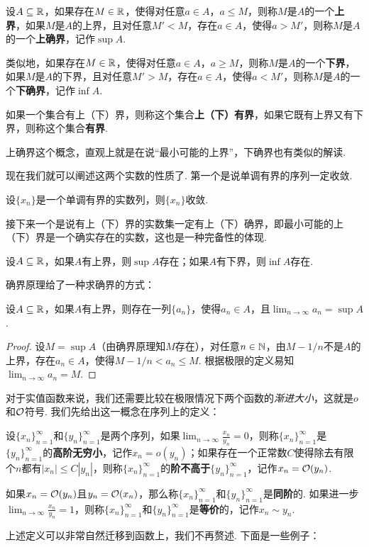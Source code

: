 \begin{definition}
    设$A\subseteq\mathbb{R}$，如果存在$M\in\mathbb{R}$，使得对任意$a\in A$，$a\leq M$，则称$M$是$A$的一个\textbf{上界}，如果$M$是$A$的上界，且对任意$M'<M$，存在$a\in A$，使得$a>M'$，则称$M$是$A$的一个\textbf{上确界}，记作$\sup A$. 
    
    类似地，如果存在$M\in\mathbb{R}$，使得对任意$a\in A$，$a\geq M$，则称$M$是$A$的一个\textbf{下界}，如果$M$是$A$的下界，且对任意$M'>M$，存在$a\in A$，使得$a<M'$，则称$M$是$A$的一个\textbf{下确界}，记作$\inf A$. 
    
    如果一个集合有上（下）界，则称这个集合\textbf{上（下）有界}，如果它既有上界又有下界，则称这个集合\textbf{有界}. 
\end{definition}
上确界这个概念，直观上就是在说“最小可能的上界”，下确界也有类似的解读. 

现在我们就可以阐述这两个实数的性质了. 第一个是说单调有界的序列一定收敛. 

\begin{proposition}[单调有界原理]\label{prop:monotone-bounded}
    设$\{x_n\}$是一个单调有界的实数列，则$\{x_n\}$收敛. 
\end{proposition}

接下来一个是说有上（下）界的实数集一定有上（下）确界，即最小可能的上（下）界是一个确实存在的实数，这也是一种完备性的体现. 
\begin{proposition}[确界原理]\label{prop:supremum}
    设$A\subseteq\mathbb{R}$，如果$A$有上界，则$\sup A$存在；如果$A$有下界，则$\inf A$存在. 
\end{proposition}

确界原理给了一种求确界的方式：
\begin{proposition}\label{prop:supremum-epsilon}
    设$A\subseteq\mathbb{R}$，如果$A$有上界，则存在一列$\{a_n\}$，使得$a_n\in A$，且$\lim_{n\to\infty}a_n=\sup A$.
\end{proposition}
\begin{proof}
    设$M=\sup A$（由确界原理知$M$存在），对任意$n\in\mathbb{N}$，由$M-1/n$不是$A$的上界，存在$a_n\in A$，使得$M-1/n<a_n\leq M$. 根据极限的定义易知$\lim_{n\to\infty}a_n=M$.
\end{proof}

对于实值函数来说，我们还需要比较在极限情况下两个函数的\emph{渐进大小}，这就是$o$和$\mathcal{O}$符号. 我们先给出这一概念在序列上的定义：

\begin{definition}[阶，无穷小，等价]
    设$\{x_n\}_{n=1}^\infty$和$\{y_n\}_{n=1}^\infty$是两个序列，如果$\lim_{n\to\infty}\frac{x_n}{y_n}=0$，则称$\{x_n\}_{n=1}^\infty$是$\{y_n\}_{n=1}^\infty$的\textbf{高阶无穷小}，记作$x_n=o(y_n)$；如果存在一个正常数$C$使得除去有限个$n$都有$|x_n|\leq C |y_n|$，则称$\{x_n\}_{n=1}^\infty$的\textbf{阶不高于}$\{y_n\}_{n=1}^\infty$，记作$x_n=\mathcal{O}(y_n)$.

    如果$x_n=\mathcal{O}(y_n)$且$y_n=\mathcal{O}(x_n)$，那么称$\{x_n\}_{n=1}^\infty$和$\{y_n\}_{n=1}^\infty$是\textbf{同阶}的. 如果进一步$\lim_{n\to\infty}\frac{x_n}{y_n}=1$，则称$\{x_n\}_{n=1}^\infty$和$\{y_n\}_{n=1}^\infty$是\textbf{等价}的，记作$x_n\sim y_n$.
\end{definition}
上述定义可以非常自然迁移到函数上，我们不再赘述. 下面是一些例子：

